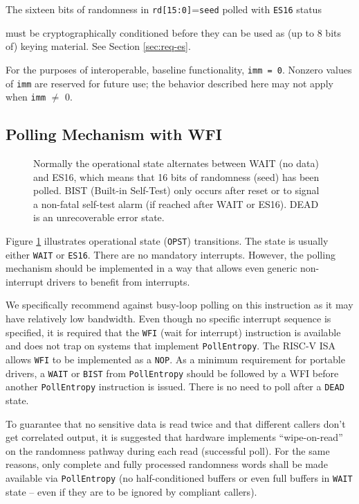     The sixteen bits of randomness in \verb|rd[15:0]|=\verb|seed| polled
    with \verb|ES16| status {must be cryptographically conditioned
    before they can be used as (up to 8 bits of) keying material.
    See Section \ref{sec:req-es}.

    For the purposes of interoperable, baseline functionality, \verb|imm = 0|.
    Nonzero values of \verb|imm| are reserved for future use; the behavior
    described here may not apply when \verb|imm| $\neq$ 0.


\subsection{Polling Mechanism with WFI}
\label{sec:es-polling}

\begin{figure}[tb]
    \centering
    
    \caption{Normally the operational state alternates between WAIT
        (no data) and ES16, which means that 16 bits of randomness (seed)
        has been polled. BIST (Built-in Self-Test) only occurs after reset
        or to signal a non-fatal self-test alarm (if reached after WAIT or
        ES16). DEAD is an unrecoverable error state.}
    \label{fig:esstate_tikz}
\end{figure}

    Figure \ref{fig:esstate_tikz} illustrates operational state
    (\verb|OPST|) transitions. The state is usually either \verb|WAIT| or
    \verb|ES16|. There are no mandatory interrupts. However, the polling
    mechanism should be implemented in a way that allows even generic
    non-interrupt drivers to benefit from interrupts.

    We specifically recommend against busy-loop polling on this instruction
    as it may have relatively low bandwidth. Even though no specific interrupt
    sequence is specified, it is required that the \verb|WFI| (wait for
    interrupt) instruction is available and does not trap on systems that
    implement \verb|PollEntropy|. The RISC-V ISA allows \verb|WFI| to be
    implemented as a \verb|NOP|.
    As a minimum requirement for portable drivers, a \verb|WAIT| or
    \verb|BIST| from \verb|PollEntropy| should be followed by a WFI before
    another \verb|PollEntropy| instruction is issued. There is
    no need to poll after a \verb|DEAD| state.

    To guarantee that no sensitive data is read twice and that different
    callers don't get correlated output, it is suggested that hardware
    implements ``wipe-on-read'' on the randomness
    pathway during each read (successful poll). For the same reasons, only complete
    and fully processed randomness words shall be made available via
    \verb|PollEntropy| (no half-conditioned buffers or even full buffers
    in \verb|WAIT| state -- even if they are to be ignored by compliant
    callers).

}
